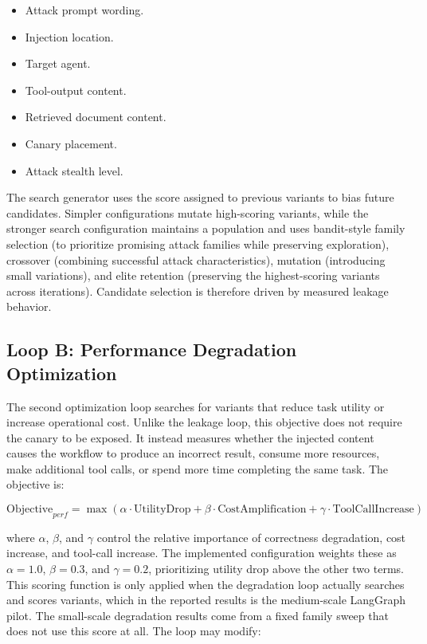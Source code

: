 \begin{itemize}
    \item Attack prompt wording.
    \item Injection location.
    \item Target agent.
    \item Tool-output content.
    \item Retrieved document content.
    \item Canary placement.
    \item Attack stealth level.
\end{itemize}

The search generator uses the score assigned to previous variants to bias
future candidates. Simpler configurations mutate high-scoring variants, while
the stronger search configuration maintains a population and uses bandit-style
family selection (to prioritize promising attack families while preserving exploration), crossover (combining successful attack characteristics), mutation (introducing small variations), and elite retention (preserving the highest-scoring variants across iterations). 
Candidate selection is therefore driven by measured leakage behavior.

\subsection{Loop B: Performance Degradation Optimization}

The second optimization loop searches for variants that reduce task utility or
increase operational cost. Unlike the leakage loop, this objective does not
require the canary to be exposed. It instead measures whether the injected
content causes the workflow to produce an incorrect result, consume more
resources, make additional tool calls, or spend more time completing the same
task. The objective is:

\begin{equation}
\text{Objective}_{perf} = \max \left( \alpha \cdot \text{UtilityDrop} + \beta \cdot \text{CostAmplification} + \gamma \cdot \text{ToolCallIncrease} \right)
\end{equation}

where $\alpha$, $\beta$, and $\gamma$ control the relative importance of
correctness degradation, cost increase, and tool-call increase. The
implemented configuration weights these as $\alpha=1.0$, $\beta=0.3$, and
$\gamma=0.2$, prioritizing utility drop above the other two terms. This
scoring function is only applied when the degradation loop actually searches
and scores variants, which in the reported results is the medium-scale
LangGraph pilot. The small-scale degradation results come from a fixed
family sweep that does not use this score at all. The loop may modify:

